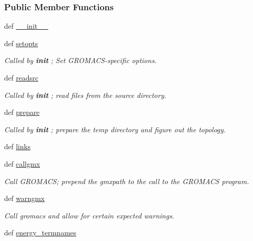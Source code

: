 \subsubsection*{Public Member Functions}
\begin{DoxyCompactItemize}
\item 
def \hyperlink{classforcebalance_1_1gmxio_1_1GMX_a4d5f9e8fb40a37a4c22551d2f30418f4}{\-\_\-\-\_\-init\-\_\-\-\_\-}
\item 
def \hyperlink{classforcebalance_1_1gmxio_1_1GMX_a97fb8be1507c0d83f448c3e8f92c6a1d}{setopts}
\begin{DoxyCompactList}\small\item\em Called by {\bfseries init} ; Set G\-R\-O\-M\-A\-C\-S-\/specific options. \end{DoxyCompactList}\item 
def \hyperlink{classforcebalance_1_1gmxio_1_1GMX_a359ebbe755cafad6003c6af14136f251}{readsrc}
\begin{DoxyCompactList}\small\item\em Called by {\bfseries init} ; read files from the source directory. \end{DoxyCompactList}\item 
def \hyperlink{classforcebalance_1_1gmxio_1_1GMX_af2dcb1a6a406a62e38985673bd903463}{prepare}
\begin{DoxyCompactList}\small\item\em Called by {\bfseries init} ; prepare the temp directory and figure out the topology. \end{DoxyCompactList}\item 
def \hyperlink{classforcebalance_1_1gmxio_1_1GMX_a2f9f89e8d7e97c872d4876751df171ce}{links}
\item 
def \hyperlink{classforcebalance_1_1gmxio_1_1GMX_a4e472c27d2c244c9ad6edb5b35f46a75}{callgmx}
\begin{DoxyCompactList}\small\item\em Call G\-R\-O\-M\-A\-C\-S; prepend the gmxpath to the call to the G\-R\-O\-M\-A\-C\-S program. \end{DoxyCompactList}\item 
def \hyperlink{classforcebalance_1_1gmxio_1_1GMX_a0a8687f6d972019fd7eef4cb8a5d86c7}{warngmx}
\begin{DoxyCompactList}\small\item\em Call gromacs and allow for certain expected warnings. \end{DoxyCompactList}\item 
def \hyperlink{classforcebalance_1_1gmxio_1_1GMX_a56e0687855e5d76c471bbcfebd352fb8}{energy\-\_\-termnames}

\end{DoxyCompactItemize}
